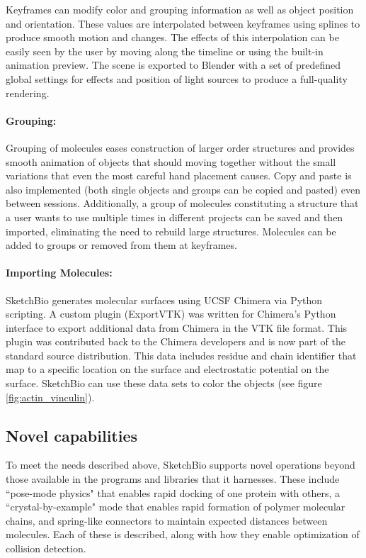 \documentclass[twocolumn]{bmcart}%
\begin{document}
Keyframes can modify color and grouping information as well as object position and orientation.
These values are interpolated between keyframes using splines to produce smooth motion and changes.
The effects of this interpolation can be easily seen by the user by moving along the timeline or using the built-in animation preview.
The scene is exported to Blender with a set of predefined global settings for effects and position of light sources to produce a full-quality rendering.

\paragraph*{Grouping:}
Grouping of molecules eases construction of larger order structures and provides smooth animation of objects that should moving together without the small variations that even the most careful hand placement causes.
Copy and paste is also implemented (both single objects and groups can be copied and pasted) even between sessions. Additionally, a group of molecules constituting a structure that a user wants to use multiple times in different projects can be saved and then imported, eliminating the need to rebuild large structures.
Molecules can be added to groups or removed from them at keyframes.

\paragraph*{Importing Molecules:}
SketchBio generates molecular surfaces using UCSF Chimera via Python scripting.
A custom plugin (ExportVTK) was written for Chimera's Python interface to export additional data from Chimera in the VTK file format.
This plugin was contributed back to the Chimera developers and is now part of the standard source distribution.
This data includes residue and chain identifier that map to a specific location on the surface and electrostatic potential on the surface.
SketchBio can use these data sets to color the objects (see figure \ref{fig:actin_vinculin}).

\subsection*{Novel capabilities}

To meet the needs described above, SketchBio supports novel operations beyond those available in the programs and libraries that it harnesses.
These include ``pose-mode physics" that enables rapid docking of one protein with others, a ``crystal-by-example" mode that enables rapid formation of polymer molecular chains, and spring-like connectors to maintain expected distances between molecules.
Each of these is described, along with how they enable optimization of collision detection.
\end{document}
